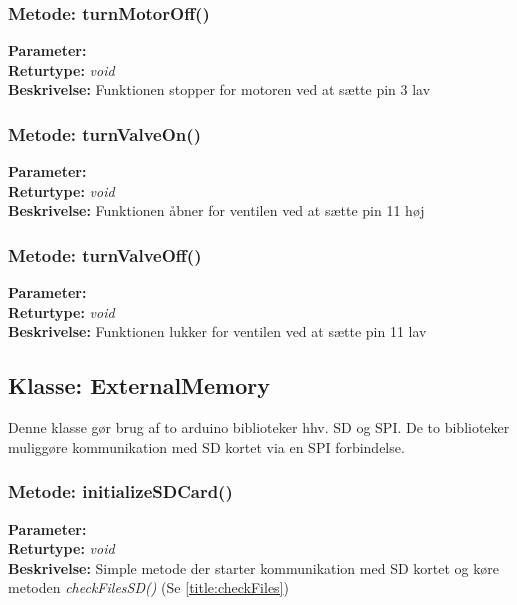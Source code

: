 \subsubsection{Metode: turnMotorOff()}
\textbf{Parameter: } 
\\ \textbf{Returtype: } \textit{void}
\\ \textbf{Beskrivelse: }   Funktionen stopper for motoren ved at sætte pin 3 lav

\subsubsection{Metode: turnValveOn()}
\textbf{Parameter: } 
\\ \textbf{Returtype: } \textit{void}
\\ \textbf{Beskrivelse: }  Funktionen åbner for ventilen ved at sætte pin 11 høj

\subsubsection{Metode: turnValveOff()}
\textbf{Parameter: } 
\\ \textbf{Returtype: } \textit{void}
\\ \textbf{Beskrivelse: }  Funktionen lukker for ventilen ved at sætte pin 11 lav

\subsection{Klasse: ExternalMemory}
Denne klasse gør brug af to arduino biblioteker hhv. SD og SPI.  De to biblioteker muliggøre kommunikation med SD kortet via en SPI forbindelse. 

\subsubsection{Metode: initializeSDCard()}
\textbf{Parameter: } 
\\ \textbf{Returtype: } \textit{void}
\\ \textbf{Beskrivelse: }  Simple metode der starter kommunikation med SD kortet og køre metoden\textit{ checkFilesSD()} (Se \ref{title:checkFiles})

